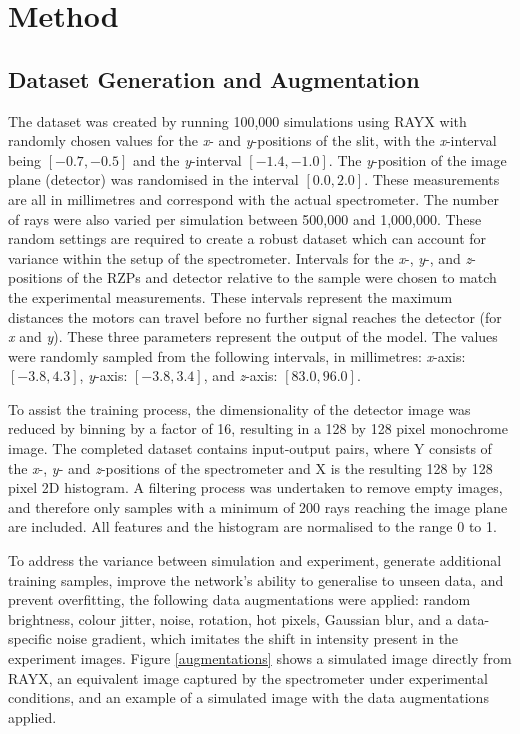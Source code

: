 \documentclass{iopconfser}
\begin{document}
\section{Method}
\subsection{Dataset Generation and Augmentation}
The dataset was created by running 100,000 simulations using RAYX with randomly chosen values for the \textit{x}- and \textit{y}-positions of the slit, with the \textit{x}-interval being \([-0.7, -0.5]\) and the \textit{y}-interval \([-1.4, -1.0]\). The \textit{y}-position of the image plane (detector) was randomised in the interval \([0.0, 2.0]\). These measurements are all in millimetres and correspond with the actual spectrometer. The number of rays were also varied per simulation between 500,000 and 1,000,000. These random settings are required to create a robust dataset which can account for variance within the setup of the spectrometer. Intervals for the \textit{x}-, \textit{y}-, and \textit{z}-positions of the RZPs and detector relative to the sample were chosen to match the experimental measurements. These intervals represent the maximum distances the motors can travel before no further signal reaches the detector (for \textit{x} and \textit{y}). These three parameters represent the output of the model. The values were randomly sampled from the following intervals, in millimetres: \textit{x}-axis: \([-3.8, 4.3]\), \textit{y}-axis: \([-3.8, 3.4]\), and \textit{z}-axis: \([83.0, 96.0]\).

To assist the training process, the dimensionality of the detector image was reduced by binning by a factor of 16, resulting in a 128 by 128 pixel monochrome image. The completed dataset contains input-output pairs, where Y consists of the \textit{x}-, \textit{y}- and \textit{z}-positions of the spectrometer and X is the resulting 128 by 128 pixel 2D histogram. A filtering process was undertaken to remove empty images, and therefore only samples with a minimum of 200 rays reaching the image plane are included. All features and the histogram are normalised to the range 0 to 1.

To address the variance between simulation and experiment, generate additional training samples, improve the network's ability to generalise to unseen data, and prevent overfitting, the following data augmentations were applied: random brightness, colour jitter, noise, rotation, hot pixels, Gaussian blur, and a data-specific noise gradient, which imitates the shift in intensity present in the experiment images. Figure \ref{augmentations} shows a simulated image directly from RAYX, an equivalent image captured by the spectrometer under experimental conditions, and an example of a simulated image with the data augmentations applied.
\end{document}
